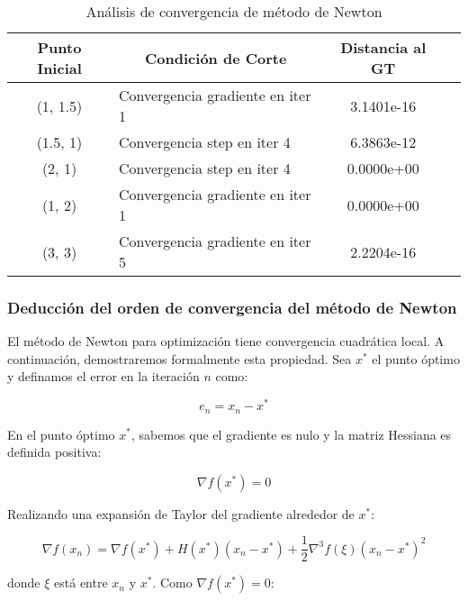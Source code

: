 \documentclass{tp02}
\begin{document}
    \begin{table}[h]
        \centering
        \begin{tabular}{|c|l|c|c|}
        \hline
        Punto Inicial & \multicolumn{1}{c|}{Condición de Corte} & Distancia al GT \\
        \hline
        (1, 1.5) & Convergencia gradiente en iter 1 & 3.1401e-16 \\
        (1.5, 1) & Convergencia step en iter 4 & 6.3863e-12 \\
        (2, 1) & Convergencia step en iter 4 & 0.0000e+00  \\
        (1, 2) & Convergencia gradiente en iter 1 & 0.0000e+00  \\
        (3, 3) & Convergencia gradiente en iter 5 & 2.2204e-16  \\
        \hline
        \end{tabular}
        \caption{Análisis de convergencia de método de Newton}
        \label{tab:convergence-points}
        \end{table}

\subsubsection{Deducción del orden de convergencia del método de Newton}

El método de Newton para optimización tiene convergencia cuadrática local. A 
continuación, demostraremos formalmente esta propiedad. Sea $x^*$ el punto óptimo 
y definamos el error en la iteración $n$ como:

\begin{equation}
    e_n = x_n - x^*
    \end{equation}
    
    En el punto óptimo $x^*$, sabemos que el gradiente es nulo y la matriz 
    Hessiana es definida positiva:
    
    \begin{equation}
    \nabla f(x^*) = 0
    \end{equation}
    
    Realizando una expansión de Taylor del gradiente alrededor de $x^*$:
    
    \begin{equation}
    \nabla f(x_n) = \nabla f(x^*) + H(x^*)(x_n - x^*) + 
    \frac{1}{2}\nabla^3f(\xi)(x_n - x^*)^2
    \end{equation}
    
    donde $\xi$ está entre $x_n$ y $x^*$. Como $\nabla f(x^*) = 0$:
    
\end{document}
